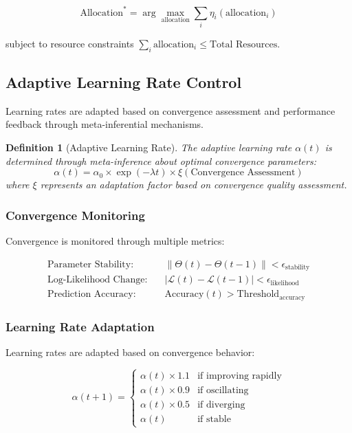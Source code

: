 \documentclass[12pt,a4paper]{article}
\newtheorem{definition}[theorem]{Definition}
\begin{document}
\begin{equation}
\text{Allocation}^* = \arg\max_{\text{allocation}} \sum_i \eta_i(\text{allocation}_i)
\end{equation}

subject to resource constraints $\sum_i \text{allocation}_i \leq \text{Total Resources}$.

\subsection{Adaptive Learning Rate Control}

Learning rates are adapted based on convergence assessment and performance feedback through meta-inferential mechanisms.

\begin{definition}[Adaptive Learning Rate]
The adaptive learning rate $\alpha(t)$ is determined through meta-inference about optimal convergence parameters:
\begin{equation}
\alpha(t) = \alpha_0 \times \exp(-\lambda t) \times \xi(\text{Convergence Assessment})
\end{equation}
where $\xi$ represents an adaptation factor based on convergence quality assessment.
\end{definition}

\subsubsection{Convergence Monitoring}

Convergence is monitored through multiple metrics:

\begin{align}
\text{Parameter Stability:} \quad &\|\Theta(t) - \Theta(t-1)\| < \epsilon_{\text{stability}} \\
\text{Log-Likelihood Change:} \quad &|\mathcal{L}(t) - \mathcal{L}(t-1)| < \epsilon_{\text{likelihood}} \\
\text{Prediction Accuracy:} \quad &\text{Accuracy}(t) > \text{Threshold}_{\text{accuracy}}
\end{align}

\subsubsection{Learning Rate Adaptation}

Learning rates are adapted based on convergence behavior:

\begin{equation}
\alpha(t+1) = \begin{cases}
\alpha(t) \times 1.1 & \text{if improving rapidly} \\
\alpha(t) \times 0.9 & \text{if oscillating} \\
\alpha(t) \times 0.5 & \text{if diverging} \\
\alpha(t) & \text{if stable}
\end{cases}
\end{equation}
\end{document}
